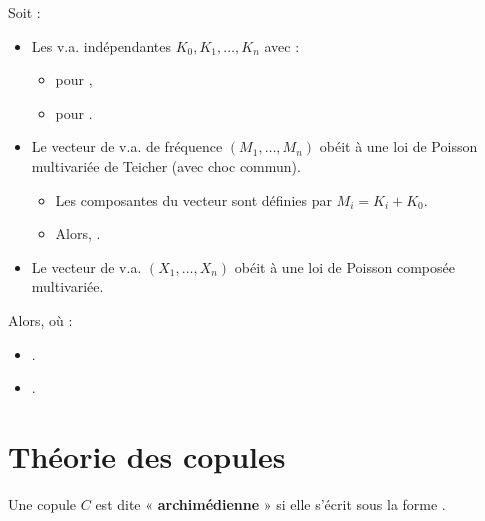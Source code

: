 \documentclass[10pt, french]{article}
\begin{document}
\begin{multicols*}{2}
\begin{definitionNOHFILL}
Soit : 
\begin{itemize}
	\item	Les v.a. indépendantes $K_{0}, K_{1}, \dots, K_{n}$ avec :
		\begin{itemize}
		\item	{} pour , 
		\item	{} pour .
		\end{itemize}
	\item	Le vecteur de v.a. de fréquence $(M_{1}, \dots, M_{n})$ obéit à une loi de Poisson multivariée de Teicher (avec choc commun). 
		\begin{itemize}
		\item	Les composantes du vecteur sont définies par $M_{i}	=	K_{i} + K_{0}$.
		\item	Alors, .
		\end{itemize}
	\item	Le vecteur de v.a. $(X_{1}, \dots, X_{n})$ obéit à une loi de Poisson composée multivariée.
\end{itemize}
Alors,  où :
\begin{itemize}
	\item	{}.
	\item	{}.
\end{itemize}
\end{definitionNOHFILL}



\pagebreak 
\section{Théorie des copules}
\begin{definitionNOHFILL}
Une copule $C$ est dite « \textbf{archimédienne} » si elle s'écrit sous la forme .	\\


\end{definitionNOHFILL}
\end{multicols*}
\end{document}
